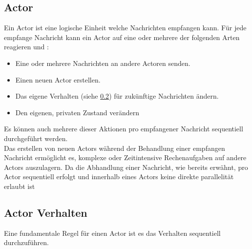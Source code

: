 \subsection{Actor}
Ein Actor ist eine logische Einheit welche Nachrichten empfangen kann. Für jede empfange Nachricht kann ein Actor auf eine oder mehrere der folgenden Arten reagieren \citep{Agha1985ActorsSystems} und \citep{Vernon2015ReactiveAkka}:
\begin{itemize}
    \item Eine oder mehrere Nachrichten an andere Actoren senden.
    \item Einen neuen Actor erstellen.
    \item Das eigene Verhalten (siehe \ref{actorBehaviour}) für zukünftige Nachrichten ändern.
    \item Den eigenen, privaten Zustand verändern
\end{itemize}
Es können auch mehrere dieser Aktionen pro empfangener Nachricht sequentiell durchgeführt werden. \\
Das erstellen von neuen Actors während der Behandlung einer empfangen Nachricht ermöglicht es, komplexe oder Zeitintensive Rechenaufgaben auf andere Actors auszulagern. Da die Abhandlung einer Nachricht, wie bereits erwähnt, pro Actor sequentiell erfolgt und innerhalb eines Actors keine direkte parallelität erlaubt ist



\subsection{Actor Verhalten}
\label{actorBehaviour}
Eine fundamentale Regel für einen Actor ist es das Verhalten sequentiell durchzuführen.
\subsection{}
